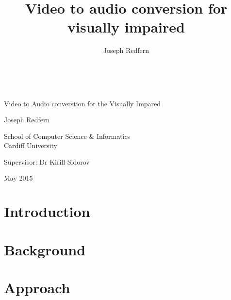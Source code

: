 \documentclass[11pt,a4paper]{memoir}
\author{Joseph Redfern}
\title{Video to audio conversion for visually impaired}
\date{}
\begin{document}
\thispagestyle{empty}

{%
\sffamily
\centering
\Large

~\vspace{\fill}

{\huge 
    Video to Audio converstion for the Visually Impared
}

\vspace{2.5cm}

{\LARGE
    Joseph Redfern
}

\vspace{3.5cm}

School of Computer Science \& Informatics\\
Cardiff University

\vspace{3.5cm}

Supervisor: Dr Kirill Sidorov 

\vspace{\fill}

May 2015

}

\cleardoublepage



\clearpage

\tableofcontents*

\clearpage

\chapter{Introduction}


\chapter{Background}


\chapter{Approach}

\clearpage



\clearpage
\printbibliography
\end{document}
